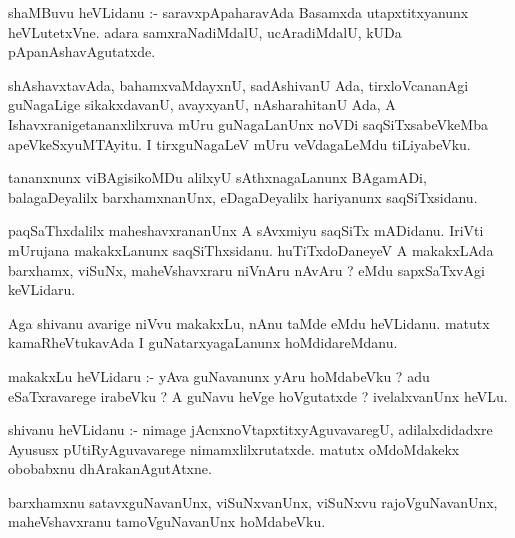 \documentclass{article}
\begin{document}
\begin{mn}
shaMBuvu  heVLidanu :- saravxpApaharavAda  Basamxda  utapxtitxyanunx  heVLutetxVne.  adara  
samxraNadiMdalU,  ucAradiMdalU,  kUDa pApanAshavAgutatxde. 

\end{mn}

\begin{mn}
shAshavxtavAda,  bahamxvaMdayxnU,  sadAshivanU  Ada,  tirxloVcananAgi  guNagaLige  sikakxdavanU,  
avayxyanU,  nAsharahitanU  Ada,  A  Ishavxranigetananxlilxruva  mUru  guNagaLanUnx  noVDi  
saqSiTxsabeVkeMba  apeVkeSxyuMTAyitu.  I  tirxguNagaLeV  mUru  veVdagaLeMdu  tiLiyabeVku.  

\end{mn}

\begin{mn}
tananxnunx  viBAgisikoMDu  alilxyU  sAthxnagaLanunx  BAgamADi,  balagaDeyalilx  barxhamxnanUnx,  
eDagaDeyalilx  hariyanunx  saqSiTxsidanu.
\end{mn}

\begin{mn}
paqSaThxdalilx  maheshavxrananUnx  A  sAvxmiyu  saqSiTx mADidanu.  IriVti  mUrujana  makakxLanunx  
saqSiThxsidanu.  huTiTxdoDaneyeV  A  makakxLAda    barxhamx,  viSuNx,  maheVshavxraru  niVnAru  
nAvAru ?  eMdu  sapxSaTxvAgi  keVLidaru.  
\end{mn}

\begin{mn}
Aga  shivanu  avarige  niVvu  makakxLu,  nAnu  taMde  eMdu  heVLidanu.  matutx  kamaRheVtukavAda  
I  guNatarxyagaLanunx  hoMdidareMdanu.
\end{mn}

\begin{mn}
makakxLu  heVLidaru :- yAva  guNavanunx  yAru  hoMdabeVku ? adu  eSaTxravarege  irabeVku ?  A  guNavu  
heVge  hoVgutatxde ?  ivelalxvanUnx heVLu.
\end{mn}

\begin{mn}
shivanu  heVLidanu :- nimage  jAcnxnoVtapxtitxyAguvavaregU,  adilalxdidadxre  Ayususx  pUtiRyAguvavarege  
nimamxlilxrutatxde.  matutx  oMdoMdakekx  obobabxnu  dhArakanAgutAtxne.
\end{mn}

\begin{mn}
barxhamxnu  satavxguNavanUnx,  viSuNxvanUnx,  viSuNxvu  rajoVguNavanUnx,  maheVshavxranu  
tamoVguNavanUnx  hoMdabeVku.  
\end{mn}
\end{document}
